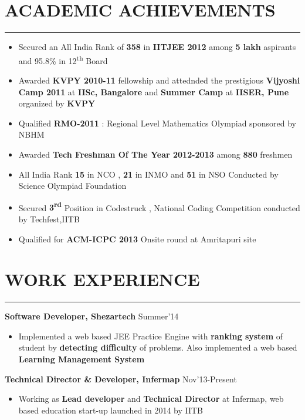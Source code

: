 \documentclass[11pt]{article} %
\begin{document}
\vspace*{15mm}
\section*{ACADEMIC ACHIEVEMENTS}
\hrule
\medskip
\begin{itemize}
\itemsep-0.4em
\item Secured an All India Rank of {\bf 358} in {\bf IITJEE 2012} among {\bf 5 lakh} aspirants and 95.8\% in 12\textsuperscript{th} Board
\item Awarded {\bf KVPY 2010-11} fellowship and  attednded the prestigious {\bf Vijyoshi Camp 2011} at {\bf IISc, Bangalore} and {\bf Summer 
Camp} at {\bf IISER, Pune} organized by {\bf KVPY}
\item Qualified {\bf RMO-2011} : Regional Level Mathematics Olympiad sponsored by NBHM 
\item Awarded {\bf Tech Freshman Of The Year 2012-2013} among {\bf 880} freshmen 
\item All India Rank {\bf 15} in NCO , {\bf 21} in INMO and {\bf 51} in NSO Conducted by Science Olympiad Foundation
\item Secured {\bf 3\textsuperscript{rd}} Position in Codestruck , National Coding Competition conducted by Techfest,IITB
\item Qualified for {\bf ACM-ICPC 2013} Onsite round at Amritapuri site
\end{itemize}
\vspace{-8mm}

\section*{WORK EXPERIENCE}
\hrule
\medskip

\noindent \textbf{Software Developer, Shezartech} \hfill Summer'14
\vspace{-3mm}
\begin{itemize}
\itemsep-0.3em
\item Implemented a web based JEE Practice Engine with {\bf ranking system} of student by {\bf detecting difficulty} of problems. Also implemented a web based {\bf Learning Management System}
\end{itemize}
\vspace{-1mm}

\noindent \textbf{Technical Director \& Developer, Infermap} \hfill Nov'13-Present
\vspace{-3mm}
\begin{itemize}
\itemsep-0.3em
\item Working as {\bf Lead developer} and {\bf Technical Director} at Infermap, web based education start-up launched in 2014 by IITB
\end{itemize}
\vspace{-1mm}
\end{document}
